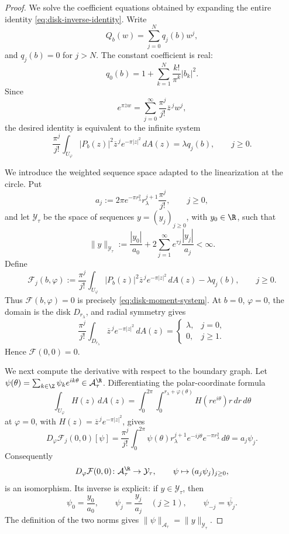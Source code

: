 \begin{proof}
We solve the coefficient equations obtained by expanding the entire identity
\eqref{eq:disk-inverse-identity}. Write
\[
Q_b(w)=\sum_{j=0}^N q_j(b)w^j,
\]
and \(q_j(b)=0\) for \(j>N\). The constant coefficient is real:
\[
q_0(b)=1+\sum_{k=1}^N \frac{k!}{\pi^k}|b_k|^2.
\]
Since
\[
e^{\pi\overline z w}
=
\sum_{j=0}^\infty \frac{\pi^j}{j!}\overline z^{\,j}w^j,
\]
the desired identity is equivalent to the infinite system
\begin{equation}\label{eq:disk-moment-system}
\frac{\pi^j}{j!}\int_{U_\varphi}
|P_b(z)|^2\overline z^{\,j}e^{-\pi |z|^2}\,dA(z)
=
\lambda q_j(b),
\qquad j\ge0 .
\end{equation}

We introduce the weighted sequence space adapted to the linearization at the
circle. Put
\[
a_j:=2\pi e^{-\pi r_\lambda^2}r_\lambda^{j+1}\frac{\pi^j}{j!},
\qquad j\ge0,
\]
and let \(\mathcal Y_\tau\) be the space of sequences
\(y=(y_j)_{j\ge0}\), with \(y_0\in\R\), such that
\[
\|y\|_{\mathcal Y_\tau}
:=
\frac{|y_0|}{a_0}
+2\sum_{j=1}^\infty e^{\tau j}\frac{|y_j|}{a_j}
<\infty .
\]
Define
\[
\mathcal F_j(b,\varphi)
:=
\frac{\pi^j}{j!}\int_{U_\varphi}
|P_b(z)|^2\overline z^{\,j}e^{-\pi |z|^2}\,dA(z)
-\lambda q_j(b),
\qquad j\ge0 .
\]
Thus \(\mathcal F(b,\varphi)=0\) is precisely
\eqref{eq:disk-moment-system}. At \(b=0\), \(\varphi=0\), the domain is the
disk \(D_{r_\lambda}\), and radial symmetry gives
\[
\frac{\pi^j}{j!}\int_{D_{r_\lambda}}
\overline z^{\,j}e^{-\pi |z|^2}\,dA(z)
=
\begin{cases}
\lambda, & j=0,\\
0, & j\ge1.
\end{cases}
\]
Hence \(\mathcal F(0,0)=0\).

We next compute the derivative with respect to the boundary graph. Let
\(\psi(\theta)=\sum_{k\in\Z}\psi_k e^{ik\theta}\in\mathcal A_\tau^\R\).
Differentiating the polar-coordinate formula
\[
\int_{U_\varphi}H(z)\,dA(z)
=
\int_0^{2\pi}\int_0^{r_\lambda+\varphi(\theta)}
H(re^{i\theta})r\,dr\,d\theta
\]
at \(\varphi=0\), with
\(H(z)=\overline z^{\,j}e^{-\pi|z|^2}\), gives
\[
D_\varphi\mathcal F_j(0,0)[\psi]
=
\frac{\pi^j}{j!}
\int_0^{2\pi}
\psi(\theta)r_\lambda^{j+1}e^{-ij\theta}e^{-\pi r_\lambda^2}
\,d\theta
=
a_j\psi_j .
\]
Consequently
\[
D_\varphi\mathcal F(0,0)\colon
\mathcal A_\tau^\R\to\mathcal Y_\tau,
\qquad
\psi\mapsto(a_j\psi_j)_{j\ge0},
\]
is an isomorphism. Its inverse is explicit:
if \(y\in\mathcal Y_\tau\), then
\[
\psi_0=\frac{y_0}{a_0},
\qquad
\psi_j=\frac{y_j}{a_j}\quad(j\ge1),
\qquad
\psi_{-j}=\overline{\psi_j}.
\]
The definition of the two norms gives
\(\|\psi\|_{\mathcal A_\tau}=\|y\|_{\mathcal Y_\tau}\).


\end{proof}
